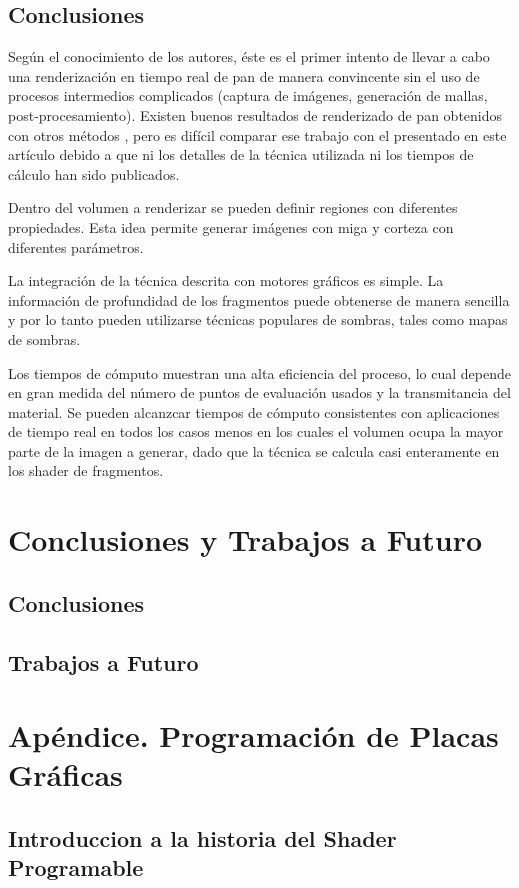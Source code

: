 \documentclass[spanish,a4paper,11pt,oneside,links]{report}
\begin{document}
\section{Conclusiones}

Según el conocimiento de los autores, éste es el primer intento de llevar a cabo una renderización en tiempo real de pan de manera convincente sin el uso de procesos intermedios complicados (captura de imágenes, generación de mallas, post-procesamiento). Existen buenos resultados de renderizado de pan obtenidos con otros métodos \cite{Cho2007}, pero es difícil comparar ese trabajo con el presentado en este artículo debido a que ni los detalles de la técnica utilizada ni los tiempos de cálculo han sido publicados.

Dentro del volumen a renderizar se pueden definir regiones con diferentes propiedades. Esta idea permite generar imágenes con miga y corteza con diferentes parámetros.

La integración de la técnica descrita con motores gráficos es simple. La información de profundidad de los fragmentos puede obtenerse de manera sencilla y por lo tanto pueden utilizarse técnicas populares de sombras, tales como mapas de sombras.

Los tiempos de cómputo muestran una alta eficiencia del proceso, lo cual depende en gran medida del número de puntos de evaluación usados y la transmitancia del material. Se pueden alcanzcar tiempos de cómputo consistentes con aplicaciones de tiempo real en todos los casos menos en los cuales el volumen ocupa la mayor parte de la imagen a generar, dado que la técnica se calcula casi enteramente en los shader de fragmentos. 

\chapter{Conclusiones y Trabajos a Futuro}
\section{Conclusiones}
\section{Trabajos a Futuro}

\chapter{Apéndice. Programación de Placas Gráficas}
\section{Introduccion a la historia del Shader Programable}
\end{document}
